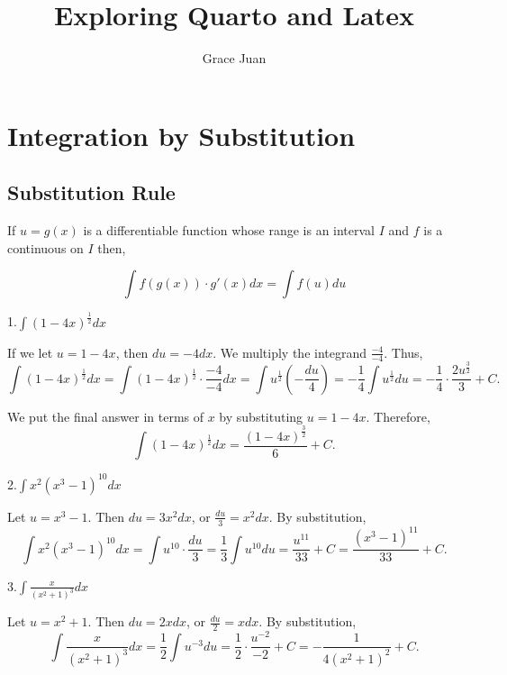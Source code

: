 \documentclass[
  letterpaper,
  DIV=11,
  numbers=noendperiod]{scrartcl}
\title{Exploring Quarto and Latex}
\author{Grace Juan}
\date{}
\begin{document}
\maketitle
\ifdefined\Shaded\renewenvironment{Shaded}{\begin{tcolorbox}[frame hidden, interior hidden, enhanced, sharp corners, boxrule=0pt, breakable, borderline west={3pt}{0pt}{shadecolor}]}{\end{tcolorbox}}\fi

\hypertarget{integration-by-substitution}{%
\section{Integration by
Substitution}\label{integration-by-substitution}}

\hypertarget{htm:subrule}{}
\hypertarget{substitution-rule}{%
\subsection{Substitution Rule}\label{substitution-rule}}

If \(u=g(x)\) is a differentiable function whose range is an interval
\(I\) and \(f\) is a continuous on \(I\) then,

\[
\int f(g(x))\cdot g'(x)dx = \int f(u)du
\]

1.\(\int \left(1-4x\right)^\frac{1}{2}dx\)

If we let \(u=1-4x\), then \(du=-4dx\). We multiply the integrand
\(\frac{-4}{-4}\). Thus, \[
\int \left(1-4x\right)^\frac{1}{2}dx = \int \left(1-4x\right)^\frac{1}{2}\cdot \frac{-4}{-4}dx = \int u^\frac{1}{2} \left( -\frac{du}{4} \right)= -\frac{1}{4} \int u^\frac{1}{2} du = -\frac{1}{4}\cdot \frac{2u^\frac{3}{2}}{3} + C. \]

We put the final answer in terms of \(x\) by substituting \(u=1-4x\).
Therefore, \[
\int \left(1-4x\right)^\frac{1}{2} dx = \frac{\left(1-4x\right)^\frac{3}{2}}{6} + C.\]

2.\(\int x^2\left(x^3-1\right)^{10} dx\)

Let \(u=x^3-1\). Then \(du=3x^2dx\), or \(\frac{du}{3}=x^2 dx\). By
substitution, \[
\int x^2\left(x^3-1\right)^{10} dx = \int u^{10}\cdot \frac{du}{3}= \frac{1}{3}\int u^{10}du=\frac{u^{11}}{33} + C= \frac{\left(x^3-1\right)^{11}}{33}+ C.
\]

3.\(\int \frac{x}{\left(x^2+1\right)^3} dx\)

Let \(u=x^2+1\). Then \(du=2xdx\), or \(\frac{du}{2}=xdx\). By
substitution, \[
\int \frac{x}{\left(x^2+1\right)^3}dx=\frac{1}{2}\int u^{-3}du=\frac{1}{2}\cdot \frac{u^{-2}}{-2}+C=-\frac{1}{4\left(x^2+1\right)^2}+C.
\]
\end{document}
